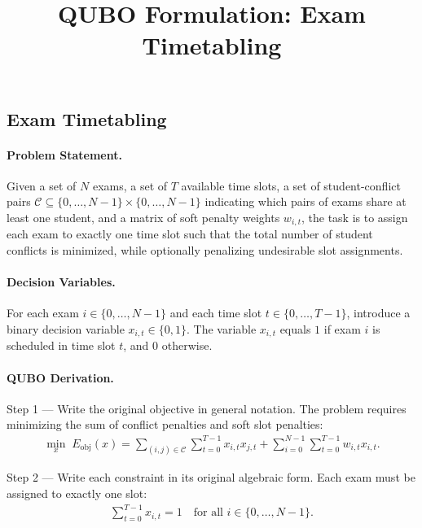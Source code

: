 \documentclass[12pt]{article}
\title{QUBO Formulation: Exam Timetabling}
\date{}
\begin{document}
\maketitle

\subsection*{Exam Timetabling}

\paragraph{Problem Statement.}
Given a set of $N$ exams, a set of $T$ available time slots, a set of student-conflict pairs $\mathcal{C} \subseteq \{0, \dots, N-1\} \times \{0, \dots, N-1\}$ indicating which pairs of exams share at least one student, and a matrix of soft penalty weights $w_{i,t}$, the task is to assign each exam to exactly one time slot such that the total number of student conflicts is minimized, while optionally penalizing undesirable slot assignments.

\paragraph{Decision Variables.}
For each exam $i \in \{0, \dots, N-1\}$ and each time slot $t \in \{0, \dots, T-1\}$, introduce a binary decision variable $x_{i,t} \in \{0, 1\}$. The variable $x_{i,t}$ equals $1$ if exam $i$ is scheduled in time slot $t$, and $0$ otherwise.

\paragraph{QUBO Derivation.}
Step 1 --- Write the original objective in general notation. The problem requires minimizing the sum of conflict penalties and soft slot penalties:
\begin{align}
\min_{x} \; E_{\text{obj}}(x) = \sum_{(i,j) \in \mathcal{C}} \sum_{t=0}^{T-1} x_{i,t} x_{j,t} + \sum_{i=0}^{N-1} \sum_{t=0}^{T-1} w_{i,t} x_{i,t}.
\end{align}

Step 2 --- Write each constraint in its original algebraic form. Each exam must be assigned to exactly one slot:
\begin{align}
\sum_{t=0}^{T-1} x_{i,t} = 1 \quad \text{for all } i \in \{0, \dots, N-1\}.
\end{align}
\end{document}
